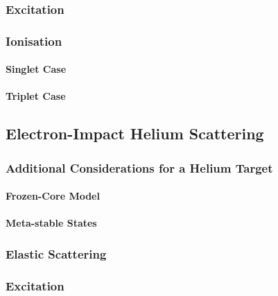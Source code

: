 \documentclass[draft]{article}
\begin{document}
\subsubsection{Excitation}
\label{sec:e-h-excitation}

\subsubsection{Ionisation}
\label{sec:e-h-ionisation}

\paragraph{Singlet Case}
\label{sec:e-h-singlet}

\paragraph{Triplet Case}
\label{sec:e-h-triplet}

\subsection{Electron-Impact Helium Scattering}
\label{sec:e-he}

\subsubsection{Additional Considerations for a Helium Target}
\label{sec:he-target}

\paragraph{Frozen-Core Model}
\label{sec:he-frozen-core}

\paragraph{Meta-stable States}
\label{sec:he-meta-stable}

\subsubsection{Elastic Scattering}
\label{sec:e-he-elastic-scattering}

\subsubsection{Excitation}
\label{sec:e-he-excitation}
\end{document}
